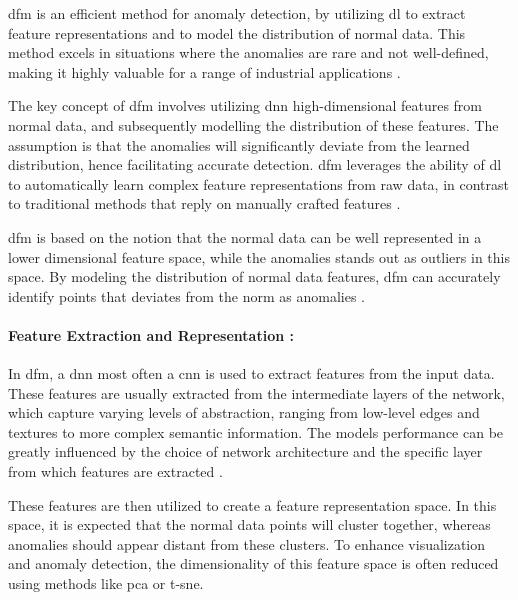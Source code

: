 \gls{dfm} is an efficient method for anomaly detection, by utilizing \gls{dl} to extract feature representations and to model the distribution of normal data. This method excels in situations where the anomalies are rare and not well-defined, making it highly valuable for a range of industrial applications \cite{ahuja2019probabilisticmodelingdeepfeatures}.

The key concept of \gls{dfm} involves utilizing \gls{dnn} high-dimensional features from normal data, and subsequently modelling the distribution of these features. The assumption is that the anomalies will significantly deviate from the learned distribution, hence facilitating accurate detection. \gls{dfm} leverages the ability of \gls{dl} to automatically learn complex feature representations from raw data, in contrast to traditional methods that reply on manually crafted features \cite{ahuja2019probabilisticmodelingdeepfeatures}.

\gls{dfm} is based on the notion that the normal data can be well represented in a lower dimensional feature space, while the anomalies stands out as outliers in this space. By modeling the distribution of normal data features, \gls{dfm} can accurately identify points that deviates from the norm as anomalies \cite{ahuja2019probabilisticmodelingdeepfeatures}.

\paragraph*{Feature Extraction and Representation :}

In \gls{dfm}, a \gls{dnn} most often a \gls{cnn} is used to extract features from the input data. These features are usually extracted from the intermediate layers of the network, which capture varying levels of abstraction, ranging from low-level edges and textures to more complex semantic information. The models performance can be greatly influenced by the choice of network architecture and the specific layer from which features are extracted \cite{8954181}.

These features are then utilized to create a feature representation space. In this space, it is expected that the normal data points will cluster together, whereas anomalies should appear distant from these clusters. To enhance visualization and anomaly detection\cite{ahuja2019probabilisticmodelingdeepfeatures}, the dimensionality of this feature space is often reduced using methods like \gls{pca}\cite{Bishop2006} or \gls{t-sne}\cite{JMLR:v9:vandermaaten08a}.

